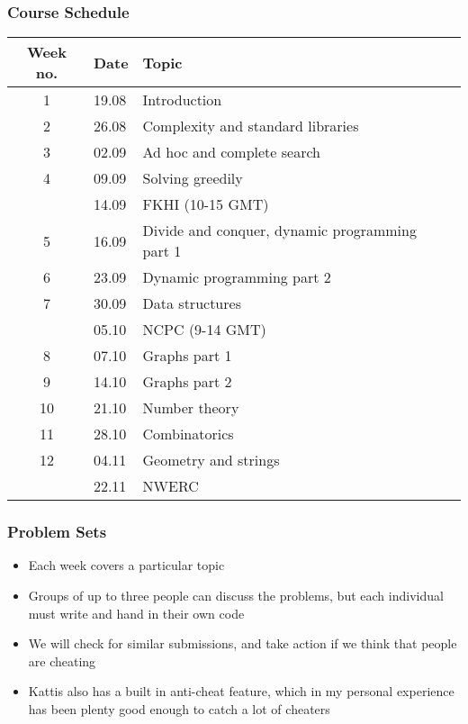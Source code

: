 \documentclass{beamer}
\begin{document}
\begin{frame}[plain]
	\frametitle{Course Schedule}
	\scriptsize
    \begin{center}
        \begin{tabular}{cl|ll}
            Week no. & Date & Topic \\ \hline
            1 & 19.08 & Introduction \\
            2 & 26.08 & Complexity and standard libraries \\
            3 & 02.09 & Ad hoc and complete search \\
            4 & 09.09 & Solving greedily \\
            & 14.09 & FKHI (10-15 GMT) \\
            5 & 16.09 & Divide and conquer, dynamic programming part 1 \\
            6 & 23.09 & Dynamic programming part 2 \\
            7 & 30.09 & Data structures \\
            & 05.10 & NCPC (9-14 GMT) \\
            8 & 07.10 & Graphs part 1 \\
            9 & 14.10 & Graphs part 2 \\
            10 & 21.10 & Number theory \\
            11 & 28.10 & Combinatorics \\
            12 & 04.11 & Geometry and strings \\
             & 22.11 & NWERC \\
        \end{tabular}
    \end{center}
\end{frame}

\begin{frame}[plain]
	\frametitle{Problem Sets}
	\begin{itemize}
		\item Each week covers a particular topic
        \item Groups of up to three people can discuss the problems, but each individual must write and hand in their own code
        \item We will check for similar submissions, and take action if we think that people are cheating
        \item Kattis also has a built in anti-cheat feature, which in my personal experience has been plenty good enough to catch a lot of cheaters
	\end{itemize}
\end{frame}
\end{document}
